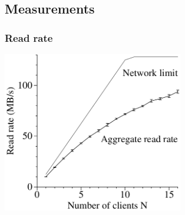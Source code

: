 \documentclass{beamer}
\begin{document}
\subsection{Measurements}
\newcommand{\ratemesoption}{7cm}
\newcommand{\ratemehspace}{\hspace{15mm}}
\begin{frame}
 \frametitle{Read rate}
 \ratemehspace
 \includegraphics[height=\ratemesoption]{figures/GFSreads.png}
\end{frame}
\end{document}
